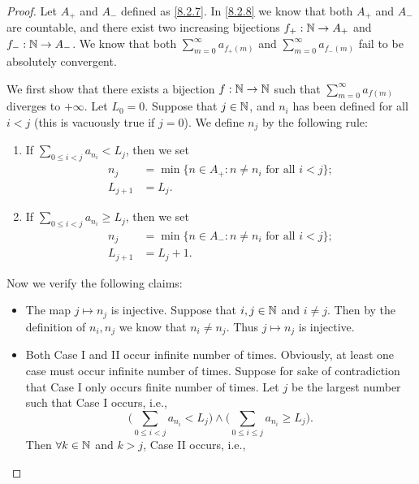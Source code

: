 \begin{proof}
  Let \(A_+\) and \(A_-\) defined as \cref{8.2.7}.
  In \cref{8.2.8} we know that both \(A_+\) and \(A_-\) are countable, and there exist two increasing bijections \(f_+ : \mathbb{N} \to A_+\) and \(f_- : \mathbb{N} \to A_-\).
  We know that both \(\sum_{m = 0}^\infty a_{f_+(m)}\) and \(\sum_{m = 0}^\infty a_{f_-(m)}\) fail to be absolutely convergent.

  We first show that there exists a bijection \(f : \mathbb{N} \to \mathbb{N}\) such that \(\sum_{m = 0}^\infty a_{f(m)}\) diverges to \(+\infty\).
  Let \(L_0 = 0\).
  Suppose that \(j \in \mathbb{N}\), and \(n_i\) has been defined for all \(i < j\)
  (this is vacuously true if \(j = 0\)).
  We define \(n_j\) by the following rule:
  \begin{enumerate}[label=(\Roman*)]
    \item If \(\sum_{0 \leq i < j} a_{n_i} < L_j\), then we set
          \begin{align*}
            n_j       & = \min\{n \in A_+ : n \neq n_i \text{ for all } i < j\}; \\
            L_{j + 1} & = L_j.
          \end{align*}
    \item If \(\sum_{0 \leq i < j} a_{n_i} \geq L_j\), then we set
          \begin{align*}
            n_j       & = \min\{n \in A_- : n \neq n_i \text{ for all } i < j\}; \\
            L_{j + 1} & = L_j + 1.
          \end{align*}
  \end{enumerate}
  Now we verify the following claims:
  \begin{itemize}
    \item The map \(j \mapsto n_j\) is injective.
          Suppose that \(i, j \in \mathbb{N}\) and \(i \neq j\).
          Then by the definition of \(n_i, n_j\) we know that \(n_i \neq n_j\).
          Thus \(j \mapsto n_j\) is injective.
    \item Both Case I and II occur infinite number of times.
          Obviously, at least one case must occur infinite number of times.
          Suppose for sake of contradiction that Case I only occurs finite number of times.
          Let \(j\) be the largest number such that Case I occurs, i.e.,
          \[
            \Bigg(\sum_{0 \leq i < j} a_{n_i} < L_j\Bigg) \land \Bigg(\sum_{0 \leq i \leq j} a_{n_i} \geq L_j\Bigg).
          \]
          Then \(\forall k \in \mathbb{N}\) and \(k > j\), Case II occurs, i.e.,
          \[
\]
\end{itemize}
\end{proof}
